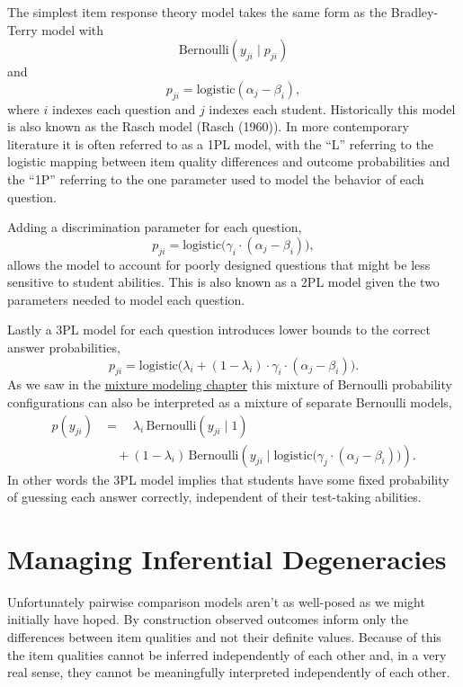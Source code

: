 \documentclass[
  letterpaper,
  DIV=11,
  numbers=noendperiod]{scrartcl}
\begin{document}
The simplest item response theory model takes the same form as the
Bradley-Terry model with \[
\text{Bernoulli}(y_{ji} \mid p_{ji})
\] and \[
p_{ji}
=
\mathrm{logistic}(\alpha_{j} - \beta_{i}),
\] where \(i\) indexes each question and \(j\) indexes each student.
Historically this model is also known as the Rasch model (Rasch (1960)).
In more contemporary literature it is often referred to as a 1PL model,
with the ``L'' referring to the logistic mapping between item quality
differences and outcome probabilities and the ``1P'' referring to the
one parameter used to model the behavior of each question.

Adding a discrimination parameter for each question, \[
p_{ji}
=
\mathrm{logistic}\big( \gamma_{i} \cdot (\alpha_{j} - \beta_{i} ) \big),
\] allows the model to account for poorly designed questions that might
be less sensitive to student abilities. This is also known as a 2PL
model given the two parameters needed to model each question.

Lastly a 3PL model for each question introduces lower bounds to the
correct answer probabilities, \[
p_{ji}
=
\mathrm{logistic}\big(
  \lambda_{i}
+ (1 - \lambda_{i}) \cdot
  \gamma_{i} \cdot (\alpha_{j} - \beta_{i} ) \big).
\] As we saw in the
\href{https://betanalpha.github.io/assets/chapters_html/mixture_modeling.html\#categorical-and-multinomial-mixture-models}{mixture
modeling chapter} this mixture of Bernoulli probability configurations
can also be interpreted as a mixture of separate Bernoulli models,
\begin{align*}
p(y_{ji})
&=
\quad \lambda_{i} \, \text{Bernoulli}(y_{ji} \mid 1)
\\
&\quad +
(1 - \lambda_{i}) \,
\text{Bernoulli}(y_{ji} \mid
  \mathrm{logistic}\big( \gamma_{j} \cdot
                         (\alpha_{j} - \beta_{i} ) \big)).
\end{align*} In other words the 3PL model implies that students have
some fixed probability of guessing each answer correctly, independent of
their test-taking abilities.

\section{Managing Inferential Degeneracies}\label{sec:inf-degen}

Unfortunately pairwise comparison models aren't as well-posed as we
might initially have hoped. By construction observed outcomes inform
only the differences between item qualities and not their definite
values. Because of this the item qualities cannot be inferred
independently of each other and, in a very real sense, they cannot be
meaningfully interpreted independently of each other.
\end{document}
